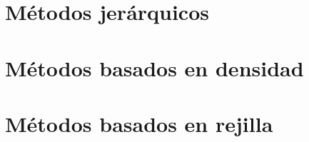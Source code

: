 \documentclass[3p,twocolumn]{elsarticle}
\begin{document}


\section{Métodos jerárquicos} \label{sec:Métodos jerárquicos}




\section{Métodos basados en densidad} \label{sec:Métodos basados en densidad}




\section{Métodos basados en rejilla} \label{sec:Métodos basados en rejilla}
\end{document}
